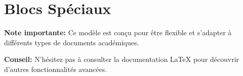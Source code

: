 \section{Blocs Spéciaux}

\begin{block}[note]
\textbf{Note importante:} Ce modèle est conçu pour être flexible et s'adapter à différents types de documents académiques.
\end{block}

\begin{block}[tip]
\textbf{Conseil:} N'hésitez pas à consulter la documentation LaTeX pour découvrir d'autres fonctionnalités avancées.
\end{block}
